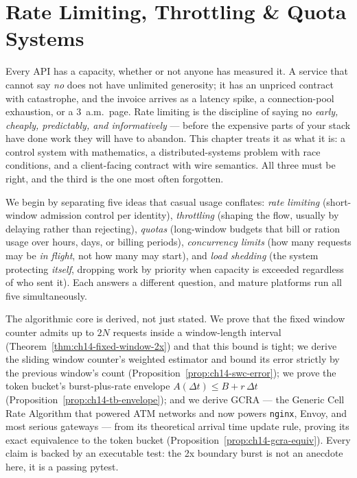 \chapter{Rate Limiting, Throttling \& Quota Systems}
\label{ch:rate_limiting}

Every API has a capacity, whether or not anyone has measured it. A service
that cannot say \emph{no} does not have unlimited generosity; it has an
unpriced contract with catastrophe, and the invoice arrives as a latency
spike, a connection-pool exhaustion, or a 3~a.m.\ page. Rate limiting is the
discipline of saying no \emph{early, cheaply, predictably, and
informatively} --- before the expensive parts of your stack have done work
they will have to abandon. This chapter treats it as what it is: a control
system with mathematics, a distributed-systems problem with race conditions,
and a client-facing contract with wire semantics. All three must be right,
and the third is the one most often forgotten.

We begin by separating five ideas that casual usage conflates:
\emph{rate limiting} (short-window admission control per identity),
\emph{throttling} (shaping the flow, usually by delaying rather than
rejecting), \emph{quotas} (long-window budgets that bill or ration usage
over hours, days, or billing periods), \emph{concurrency limits} (how many
requests may be \emph{in flight}, not how many may start), and \emph{load
shedding} (the system protecting \emph{itself}, dropping work by priority
when capacity is exceeded regardless of who sent it). Each answers a
different question, and mature platforms run all five simultaneously.

The algorithmic core is derived, not just stated. We prove that the fixed
window counter admits up to $2N$ requests inside a window-length interval
(Theorem~\ref{thm:ch14-fixed-window-2x}) and that this bound is tight; we
derive the sliding window counter's weighted estimator and bound its error
strictly by the previous window's count
(Proposition~\ref{prop:ch14-swc-error}); we prove the token bucket's
burst-plus-rate envelope $A(\Delta t) \le B + r\,\Delta t$
(Proposition~\ref{prop:ch14-tb-envelope}); and we derive GCRA --- the Generic
Cell Rate Algorithm that powered ATM networks and now powers
\texttt{nginx}, Envoy, and most serious gateways --- from its theoretical
arrival time update rule, proving its exact equivalence to the token bucket
(Proposition~\ref{prop:ch14-gcra-equiv}). Every claim is backed by an
executable test: the 2x boundary burst is not an anecdote here, it is a
passing pytest.

